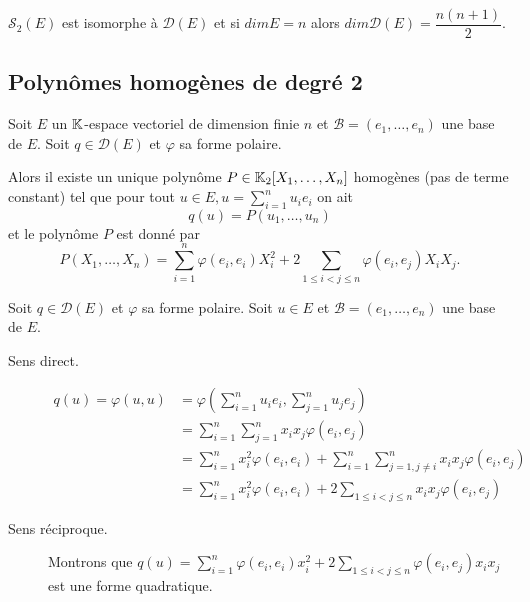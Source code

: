 \documentclass[a4paper,12pt]{article}
\begin{document}
\begin{demonstration}
    
\end{demonstration}

\begin{corollaire}{}{}
    $\mathcal{S}_2(E)$ est isomorphe à $\mathcal{D}(E)$ et si $dim E = n$ alors $dim \mathcal{D}(E) = \dfrac{n(n + 1)}{2}$.
\end{corollaire}

\begin{demonstration}
    
\end{demonstration}

\subsection{Polynômes homogènes de degré 2}

\begin{proposition}{}{}
    Soit $E$ un $\mathbb{K}$-espace vectoriel de dimension finie $n$ et $\mathcal{B} = (e_1, \dots, e_n)$ une base de $E$.
    Soit $q \in \mathcal{D}(E)$ et $\varphi$ sa forme polaire.

    Alors il existe un unique polynôme $P \in \mathbb{K}_2[X_1, \dots, X_n]$ homogènes (pas de terme constant)
    tel que pour tout $u \in E, u = \sum\limits_{i=1}^n u_i e_i$ on ait
    $$
    q(u) = P(u_1, \dots, u_n)
    $$
    et le polynôme $P$ est donné par
    $$
    P(X_1, \dots, X_n) = \sum\limits_{i=1}^n \varphi(e_i, e_i) X_i^2 + 2 \sum\limits_{1 \leq i < j \leq n} \varphi(e_i, e_j) X_i X_j.
    $$

\end{proposition}

\begin{demonstration}
    Soit $q \in \mathcal{D}(E)$ et $\varphi$ sa forme polaire.
    Soit $u \in E$ et $\mathcal{B} = (e_1, \dots, e_n)$ une base de $E$.
    
    \begin{description}
        \item[Sens direct.] 
        \begin{align*}
            q(u) = \varphi(u, u) &= \varphi\left( \sum\limits_{i=1}^n u_i e_i, \sum\limits_{j=1}^n u_j e_j \right) \\
            &= \sum_{i=1}^n \sum_{j=1}^n x_i x_j \varphi(e_i, e_j) \\
            &= \sum_{i=1}^n x_i^2 \varphi(e_i, e_i) + \sum_{i=1}^n \sum_{j=1, j \neq i}^n x_i x_j \varphi(e_i, e_j) \\
            &= \sum_{i=1}^n x_i^2 \varphi(e_i, e_i) + 2 \sum_{1 \leq i < j \leq n} x_i x_j \varphi(e_i, e_j)
        \end{align*}

        \item[Sens réciproque.]
        Montrons que $q(u) = \sum_{i=1}^n \varphi(e_i, e_i) x_i^2 + 2 \sum_{1 \leq i < j \leq n} \varphi(e_i, e_j) x_i x_j$ est une forme quadratique.

        
    \end{description}
\end{demonstration}
\end{document}
